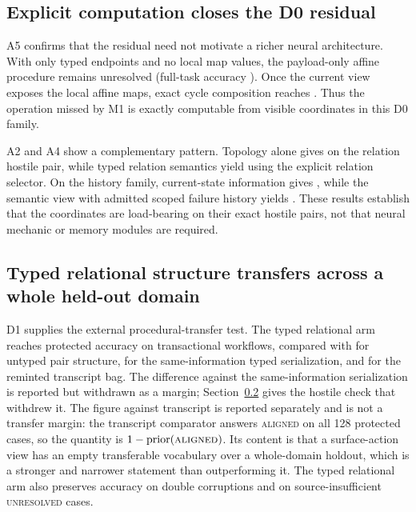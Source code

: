 \subsection{Explicit computation closes the D0 residual}

A5 confirms that the residual need not motivate a richer neural architecture. With only typed endpoints and no local map values, the payload-only affine procedure remains unresolved (full-task accuracy \AFiveTypedAccuracy{}). Once the current view exposes the local affine maps, exact cycle composition reaches \AFiveCurrentAccuracy{}. Thus the operation missed by M1 is exactly computable from visible coordinates in this D0 family.

A2 and A4 show a complementary pattern. Topology alone gives \ATwoTopologyAccuracy{} on the relation hostile pair, while typed relation semantics yield \ATwoTypedAccuracy{} using the explicit relation selector. On the history family, current-state information gives \AFourCurrentAccuracy{}, while the semantic view with admitted scoped failure history yields \AFourSemanticAccuracy{}. These results establish that the coordinates are load-bearing on their exact hostile pairs, not that neural mechanic or memory modules are required.

\subsection{Typed relational structure transfers across a whole held-out domain}
\label{sec:d1-hostile}

D1 supplies the external procedural-transfer test. The typed relational arm reaches \DOneTypedAccuracy{} protected accuracy on transactional workflows, compared with \DOneUntypedAccuracy{} for untyped pair structure, \DOneSerializedAccuracy{} for the same-information typed serialization, and \DOneTranscriptAccuracy{} for the reminted transcript bag. The \DOneTypedMinusSerialized{} difference against the same-information serialization is reported but withdrawn as a margin; Section~\ref{sec:d1-hostile} gives the hostile check that withdrew it. The \DOneTypedMinusTranscript{} figure against transcript is reported separately and is not a transfer margin: the transcript comparator answers \textsc{aligned} on all 128 protected cases, so the quantity is $1-\text{prior}(\textsc{aligned})$. Its content is that a surface-action view has an empty transferable vocabulary over a whole-domain holdout, which is a stronger and narrower statement than outperforming it. The typed relational arm also preserves \DOneTypedDoubleAccuracy{} accuracy on double corruptions and \DOneTypedUnresolvedAccuracy{} on source-insufficient \textsc{unresolved} cases.


